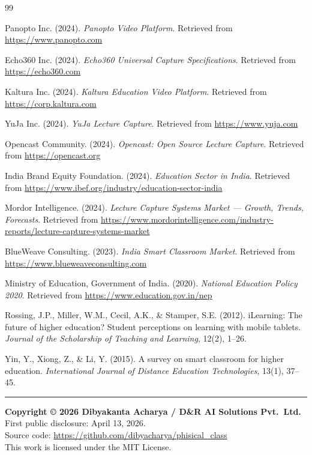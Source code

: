\documentclass[12pt,a4paper]{article}
\begin{document}
\begin{thebibliography}{99}

Panopto Inc. (2024). \textit{Panopto Video Platform}. Retrieved from \url{https://www.panopto.com}

Echo360 Inc. (2024). \textit{Echo360 Universal Capture Specifications}. Retrieved from \url{https://echo360.com}

Kaltura Inc. (2024). \textit{Kaltura Education Video Platform}. Retrieved from \url{https://corp.kaltura.com}

YuJa Inc. (2024). \textit{YuJa Lecture Capture}. Retrieved from \url{https://www.yuja.com}

Opencast Community. (2024). \textit{Opencast: Open Source Lecture Capture}. Retrieved from \url{https://opencast.org}

India Brand Equity Foundation. (2024). \textit{Education Sector in India}. Retrieved from \url{https://www.ibef.org/industry/education-sector-india}

Mordor Intelligence. (2024). \textit{Lecture Capture Systems Market — Growth, Trends, Forecasts}. Retrieved from \url{https://www.mordorintelligence.com/industry-reports/lecture-capture-systems-market}

BlueWeave Consulting. (2023). \textit{India Smart Classroom Market}. Retrieved from \url{https://www.blueweaveconsulting.com}

Ministry of Education, Government of India. (2020). \textit{National Education Policy 2020}. Retrieved from \url{https://www.education.gov.in/nep}

Rossing, J.P., Miller, W.M., Cecil, A.K., \& Stamper, S.E. (2012). iLearning: The future of higher education? Student perceptions on learning with mobile tablets. \textit{Journal of the Scholarship of Teaching and Learning}, 12(2), 1--26.

Yin, Y., Xiong, Z., \& Li, Y. (2015). A survey on smart classroom for higher education. \textit{International Journal of Distance Education Technologies}, 13(1), 37--45.

\end{thebibliography}

\vspace{2em}
\hrule
\vspace{0.5em}

\begin{center}
\small
\textbf{Copyright \copyright{} 2026 Dibyakanta Acharya / D\&R AI Solutions Pvt.\ Ltd.}\\
First public disclosure: April 13, 2026.\\
Source code: \url{https://github.com/dibyacharya/phisical_class}\\
This work is licensed under the MIT License.
\end{center}
\end{document}
